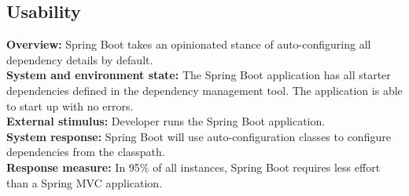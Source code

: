 \subsection*{Usability}

\textbf{Overview:} Spring Boot takes an opinionated stance of auto-configuring all dependency details by default. \\

\textbf{System and environment state:} The Spring Boot application has all starter dependencies defined in the dependency management tool. The application is able to start up with no errors. \\

\textbf{External stimulus:} Developer runs the Spring Boot application. \\

\textbf{System response:} Spring Boot will use auto-configuration classes to configure dependencies from the classpath. \\

\textbf{Response measure:} In 95\% of all instances, Spring Boot requires less effort than a Spring MVC application.
